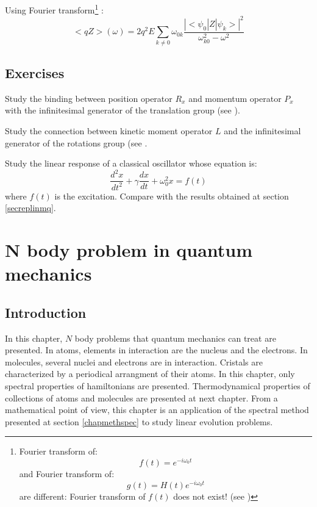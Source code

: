 \documentclass[12pt]{book}
\begin{document}
Using Fourier transform\footnote{%
Fourier transform of:
\begin{equation}
f(t)=e^{-i\omega_0t}
\end{equation}
and Fourier transform of:
\begin{equation}
g(t)=H(t)e^{-i\omega_0t}
\end{equation}
are different: Fourier transform of $f(t)$ does not exist! (see \cite{ma:distr:Schwartz65,ma:distr:Zemanian87})
}%
:
\begin{equation}
\mathrel{<} qZ\mathrel{>} (\omega)=2q^2E\sum_{k\neq 0}\omega_{0k}\frac{| \mathrel{<} \psi_0|Z|\psi_k\mathrel{>} |^2}{\omega_{k0}^2-\omega^2}
\end{equation}


\section{Exercises}
\begin{exo}
Study the binding between position operator $R_x$ and momentum operator $P_x$
with the infinitesimal generator of the translation group (see
\cite{ma:equad:Dautray5}). 
\end{exo}

\begin{exo}
Study the connection between kinetic moment operator $L$ and the infinitesimal
generator of the rotations group (see
\cite{ma:equad:Dautray5}.
\end{exo}

\begin{exo}
Study the linear response of a classical oscillator whose equation is:
\begin{equation}
\frac{d^{2}x}{dt^{2}}+\gamma \frac{dx}{dt}+\omega_{0}^{2}x=f(t)
\end{equation}
where $f(t)$ is the excitation.
Compare with the results obtained at section \ref{secreplinmq}.
\end{exo}

\chapter{N body problem in quantum mechanics}\label{chapproncorps} 
\section{Introduction}
In this chapter, $N$ body problems that quantum mechanics can treat are
presented. In atoms, elements in interaction are the nucleus and the
electrons. In molecules, several nuclei and electrons are in
interaction. Cristals are characterized by a periodical arrangment of
their atoms. In this chapter, only 
spectral properties of hamiltonians are presented. Thermodynamical properties
of collections of atoms and molecules are presented at next chapter.
From a mathematical point of view, this chapter is an application of the
spectral method presented at section \ref{chapmethspec} to study linear
evolution problems.
\end{document}
